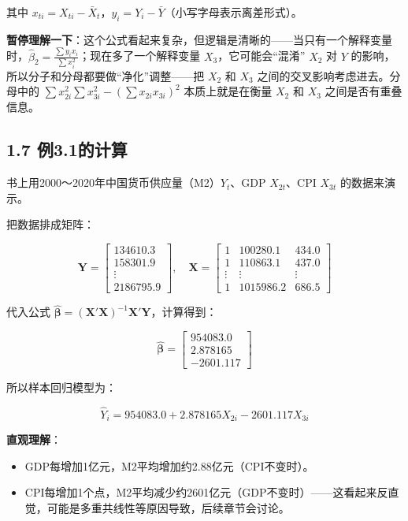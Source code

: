 \documentclass[12pt,a4paper]{ctexart}
\begin{document}
其中 $x_{ti} = X_{ti} - \bar{X}_t$，$y_i = Y_i - \bar{Y}$（小写字母表示离差形式）。

\textbf{暂停理解一下}：这个公式看起来复杂，但逻辑是清晰的——当只有一个解释变量时，$\hat{\beta}_2 = \frac{\sum y_i x_i}{\sum x_i^2}$；现在多了一个解释变量 $X_3$，它可能会“混淆” $X_2$ 对 $Y$ 的影响，所以分子和分母都要做“净化”调整——把 $X_2$ 和 $X_3$ 之间的交叉影响考虑进去。分母中的 $\sum x_{2i}^2 \sum x_{3i}^2 - (\sum x_{2i} x_{3i})^2$ 本质上就是在衡量 $X_2$ 和 $X_3$ 之间是否有重叠信息。

\subsection{1.7 例3.1的计算}

书上用2000～2020年中国货币供应量（M2）$Y_t$、GDP $X_{2t}$、CPI $X_{3t}$ 的数据来演示。

把数据排成矩阵：

\[
\mathbf{Y} =
\begin{bmatrix}
134610.3 \\ 158301.9 \\ \vdots \\ 2186795.9
\end{bmatrix},
\quad
\mathbf{X} =
\begin{bmatrix}
1 & 100280.1 & 434.0 \\
1 & 110863.1 & 437.0 \\
\vdots & \vdots & \vdots \\
1 & 1015986.2 & 686.5
\end{bmatrix}
\]

代入公式 $\hat{\boldsymbol{\beta}} = (\mathbf{X}'\mathbf{X})^{-1}\mathbf{X}'\mathbf{Y}$，计算得到：

\[
\hat{\boldsymbol{\beta}} =
\begin{bmatrix}
954083.0 \\ 2.878165 \\ -2601.117
\end{bmatrix}
\]

所以样本回归模型为：

\[
\hat{Y}_i = 954083.0 + 2.878165 X_{2i} - 2601.117 X_{3i}
\]

\textbf{直观理解}：
\begin{itemize}
    \item GDP每增加1亿元，M2平均增加约2.88亿元（CPI不变时）。
    \item CPI每增加1个点，M2平均减少约2601亿元（GDP不变时）——这看起来反直觉，可能是多重共线性等原因导致，后续章节会讨论。
\end{itemize}
\end{document}
